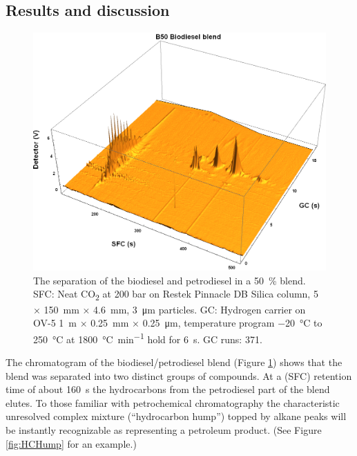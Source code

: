 \subsection{Results and discussion}
\label{sec:B50Discuss}
\begin{figure}
	\centering
	\includegraphics[width=\textwidth]{Figures/B50.png}
	\decoRule	
	
\caption[Biodiesel separated from petrodiesel.]{The separation of the biodiesel
and petrodiesel in a \SI{50}{\percent} blend. SFC: Neat CO\textsubscript{2} at
200 bar on Restek Pinnacle DB Silica column, 5 × \SI{150}{\milli\metre} ×
\SI{4.6}{\milli\metre}, \SI{3}{\micro\metre} particles. GC: Hydrogen carrier on
OV-5 \SI{1}{\metre} × \SI{0.25}{\milli\metre} × \SI{0.25}{\micro\metre},
temperature program \SI{-20}{\celsius} to \SI{250}{\celsius} at
\SI{1800}{\celsius\per\minute} hold for \SI{6}{\second}. GC runs: 371.}

	
	\label{fig:B50} 
\end{figure}

The chromatogram of the biodiesel/petrodiesel blend (Figure \ref{fig:B50}) shows
that the blend was separated into two distinct groups of compounds. At a \oneD
(SFC) retention time of about \SI{160}{\second} the hydrocarbons from the
petrodiesel part of the blend elutes. To those familiar with petrochemical
chromatography the characteristic unresolved complex mixture (``hydrocarbon
hump'') topped by alkane peaks will be instantly recognizable as representing
a petroleum product. (See Figure \ref{fig:HCHump} for an example.)


